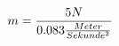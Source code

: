 \documentclass[preview]{standalone}
\begin{document}
\begin{align*}
{\special{dvisvgm:raw <g id='unique000'>}m = \frac{5N}{0.083 \frac{Meter}{Sekunde^{2}}}}\special{dvisvgm:raw </g>}
\end{align*}
\end{document}

